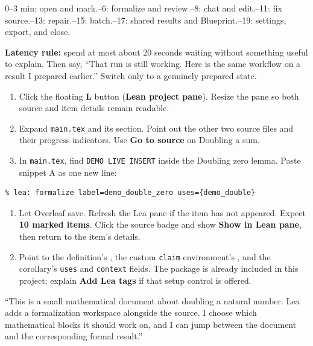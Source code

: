 
0--3 min: open and mark.--6: formalize and review.--8: chat and edit.--11: fix source.--13: repair.--15: batch.--17: shared results and Blueprint.--19: settings, export, and close.

\textbf{Latency rule:} spend at most about 20 seconds waiting without something
useful to explain. Then say, ``That run is still working. Here is the same workflow
on a result I prepared earlier.'' Switch only to a genuinely prepared state.

\clearpage
{}

\click
\begin{enumerate}
  \item Click the floating \textbf{L} button (\textbf{Lean project pane}). Resize
    the pane so both source and item details remain readable.
  \item Expand \texttt{main.tex} and its section. Point out the other two source
    files and their progress indicators. Use \textbf{Go to source} on Doubling a sum.
  \item In \texttt{main.tex}, find \texttt{DEMO LIVE INSERT} inside the Doubling zero
    lemma. Paste snippet A as one new line:
\end{enumerate}
\begin{lstlisting}
% lea: formalize label=demo_double_zero uses={demo_double}
\end{lstlisting}
\begin{enumerate}[resume]
  \item Let Overleaf save. Refresh the Lea pane if the item has not appeared.
    Expect \textbf{10 marked items}. Click the source badge and show
    \textbf{Show in Lean pane}, then return to the item's details.
  \item Point to the definition's \texttt{\string\leadefinition}, the custom
    \texttt{claim} environment's \texttt{\string\leatheorem}, and the corollary's
    \texttt{uses} and \texttt{context} fields. The package is already included in
    this project; explain \textbf{Add Lea tags} if that setup control is offered.
\end{enumerate}

\say
``This is a small mathematical document about doubling a natural number.
Lea adds a formalization workspace alongside the source. I choose which
mathematical blocks it should work on, and I can jump between the document
and the corresponding formal result.''

